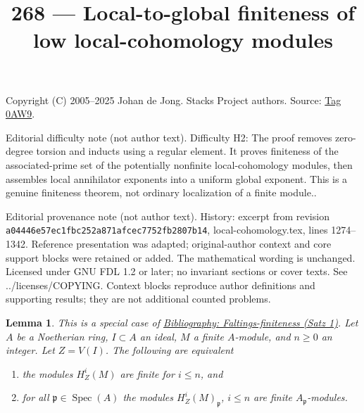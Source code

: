 \documentclass{amsart}
\newenvironment{reference}{\comment}{\endcomment}
\theoremstyle{plain}
\newtheorem{lemma}[subsection]{Lemma}
\theoremstyle{definition}
\theoremstyle{remark}
\numberwithin{equation}{subsection}
\def\Spec{\mathop{\mathrm{Spec}}}
\begin{document}
\title[Stacks Project, Tag 0AW9]{268 --- Local-to-global finiteness of low local-cohomology modules}
\maketitle
\noindent Copyright (C) 2005--2025 Johan de Jong. Stacks Project authors. Source: \href{https://stacks.math.columbia.edu/tag/0AW9}{Tag 0AW9}.

\noindent Editorial difficulty note (not author text). Difficulty H2: The proof removes zero-degree torsion and inducts using a regular element. It proves finiteness of the associated-prime set of the potentially nonfinite local-cohomology modules, then assembles local annihilator exponents into a uniform global exponent. This is a genuine finiteness theorem, not ordinary localization of a finite module..

\noindent Editorial provenance note (not author text). History: excerpt from revision \texttt{a0444\allowbreak 6e57e\allowbreak c1fbc\allowbreak 252a8\allowbreak 71afc\allowbreak ec775\allowbreak 2fb28\allowbreak 07b14}, local-cohomology.tex, lines 1274--1342. Reference presentation was adapted; original-author context and core support blocks were retained or added. The mathematical wording is unchanged. Licensed under GNU FDL 1.2 or later; no invariant sections or cover texts. See ../licenses/COPYING. Context blocks reproduce author definitions and supporting results; they are not additional counted problems.

\begin{lemma}
\label{lemma-check-finiteness-local-cohomology-locally}
\begin{reference}
This is a special case of \href{https://stacks.math.columbia.edu/bibliography}{Bibliography: Faltings-finiteness (Satz 1)}.
\end{reference}
Let $A$ be a Noetherian ring, $I \subset A$ an ideal, $M$ a finite
$A$-module, and $n \geq 0$ an integer. Let $Z = V(I)$.
The following are equivalent
\begin{enumerate}
\item the modules $H^i_Z(M)$ are finite for $i \leq n$, and
\item for all $\mathfrak p \in \Spec(A)$ the modules
$H^i_Z(M)_\mathfrak p$, $i \leq n$ are finite $A_\mathfrak p$-modules.
\end{enumerate}
\end{lemma}
\end{document}
